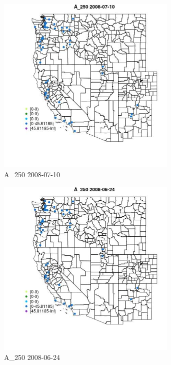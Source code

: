 \begin{figure} 
\centering  
\includegraphics[width=0.77\textwidth]{Code_Outputs/Report_ML_input_PM25_Step4_part_e_de_duplicated_aves_MapObsA_2502008-07-10.jpg} 
\caption{\label{fig:Report_ML_input_PM25_Step4_part_e_de_duplicated_avesMapObsA_2502008-07-10}A_250 2008-07-10} 
\end{figure} 
 

\begin{figure} 
\centering  
\includegraphics[width=0.77\textwidth]{Code_Outputs/Report_ML_input_PM25_Step4_part_e_de_duplicated_aves_MapObsA_2502008-06-24.jpg} 
\caption{\label{fig:Report_ML_input_PM25_Step4_part_e_de_duplicated_avesMapObsA_2502008-06-24}A_250 2008-06-24} 
\end{figure} 
 

